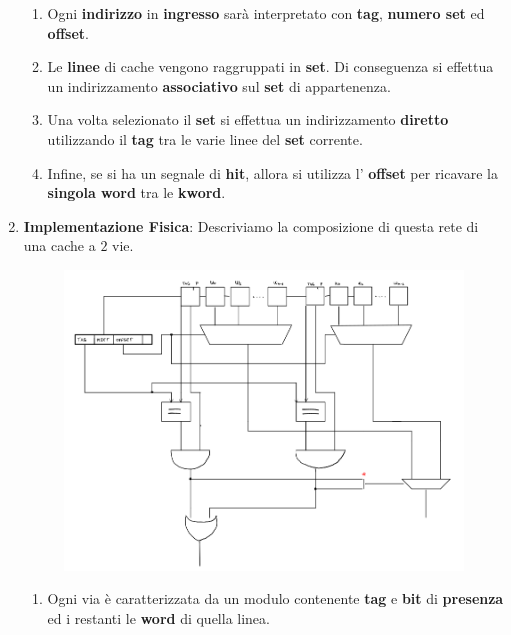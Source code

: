 \documentclass{article}
\begin{document}
\begin{enumerate}
    \begin{enumerate}
        \item Ogni \textbf{indirizzo} in \textbf{ingresso} sarà interpretato con \textbf{tag}, \textbf{numero set} ed \textbf{offset}.
        \item Le \textbf{linee} di cache vengono raggruppati in \textbf{set}. Di conseguenza si effettua un indirizzamento \textbf{associativo} sul \textbf{set} di appartenenza.
        \item Una volta selezionato il \textbf{set} si effettua un indirizzamento \textbf{diretto} utilizzando il \textbf{tag} tra le varie linee del \textbf{set} corrente.
        \item Infine, se si ha un segnale di \textbf{hit}, allora si utilizza l' \textbf{offset} per ricavare la \textbf{singola word} tra le \textbf{kword}.
    \end{enumerate}

    \item \textbf{Implementazione Fisica}: Descriviamo la composizione di questa rete di una cache a $2$ vie.

    \begin{figure}[htbp]
        \center
        \includegraphics[scale=0.3]{img/ind_set_associativo_fisico.png}
    \end{figure}

    \begin{enumerate}
        \item Ogni via è caratterizzata da un modulo contenente \textbf{tag} e \textbf{bit} di \textbf{presenza} ed i restanti le \textbf{word} di quella linea.


\end{enumerate}
\end{enumerate}
\end{document}
